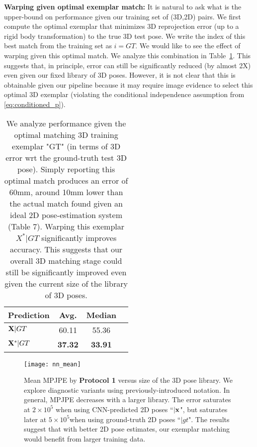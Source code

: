\documentclass[10pt,twocolumn,letterpaper]{article}
\begin{document}
{\bf Warping given optimal exemplar match:} It is natural to ask what is the upper-bound on performance given our training set of (3D,2D) pairs. We first compute the optimal exemplar that minimizes 3D reprojection error (up to a rigid body transformation) to the true 3D test pose. We write the index of this best match from the training set as $i=GT$. We would like to see the effect of warping given this optimal match. We analyze this combination in Table~\ref{table: gt3d_nn_comp}. This suggests that, in principle, error can still be significantly reduced (by almost 2X) even given our fixed library of 3D poses. However, it is not clear that this is obtainable given our pipeline because it may require image evidence to select this optimal 3D exemplar (violating the conditional independence assumption from \eqref{eq:conditioned_p}).


\begin{table}[t!]
\centering
\begin{tabular}{|l|c|c|c|}
\hline
Prediction & Avg. & Median \\
\hline
\hline
${\bf X}|GT$ & 60.11 & 55.36\\
${\bf X}^{*}|GT$ & \textbf{37.32} & \textbf{33.91}\\
\hline
\end{tabular}
\caption{We analyze performance given the optimal matching 3D training exemplar "GT" (in terms of 3D error wrt the ground-truth test 3D pose). Simply reporting this optimal match produces an error of 60mm, around 10mm lower than the actual match found given an ideal 2D pose-estimation system (Table 7). Warping this exemplar $X^*|GT$ significantly improves accuracy. This suggests that our overall 3D matching stage could still be significantly improved even given the current size of the library of 3D poses.} \label{table: gt3d_nn_comp}
\end{table}




\begin{figure}[t!]
\centering
\texttt{[image: nn\_mean]}
 \caption{Mean MPJPE by \textbf{Protocol 1} versus size of the 3D pose library. We explore diagnostic variants using previously-introduced notation.
   In general, MPJPE decreases with a larger library. The error saturates at  $2\times10^5$ when using CNN-predicted 2D poses ``$|{\bf x}$", but saturates later at  $5\times10^5$when using ground-truth 2D poses ``$|gt$". The results suggest that with better 2D pose estimates, our exemplar matching would benefit from larger training data.}
 \label{fig:mean_nn}
\end{figure}
\end{document}
